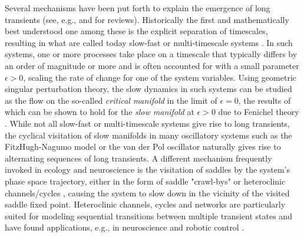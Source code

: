 \documentclass{article}
\theoremstyle{definition}
\begin{document}
\begin{refsection}
Several mechanisms have been put forth to explain the emergence of long transients (see, e.g., \cite{Hastings_2018} and \cite{Rossi_2025} for reviews). Historically the first and mathematically best understood one among these is the explicit separation of timescales, resulting in what are called today slow-fast or multi-timescale systems \cite{Tikhonov1952,Verhulst2005,Kuehn_2015,Bertram2017}. In such systems, one or more processes take place on a timescale that typically differs by an order of magnitude or more and is often accounted for with a small parameter $\epsilon>0$, scaling the rate of change for one of the system variables. Using geometric singular perturbation theory, the slow dynamics in such systems can be studied as the flow on the so-called \textit{critical manifold} in the limit of $\epsilon=0$, the results of which can be shown to hold for the \textit{slow manifold} at $\epsilon>0$ due to Fenichel theory \cite{Fenichel_1971,Fenichel_1979}. While not all slow-fast or multi-timescale systems give rise to long transients, the cyclical visitation of slow manifolds in many oscillatory systems such as the FitzHugh-Nagumo model or the van der Pol oscillator naturally gives rise to alternating sequences of long transients. A different mechanism frequently invoked in ecology and neuroscience is the visitation of saddles by the system's phase space trajectory, either in the form of saddle "crawl-bys" \cite{Hastings_2018} or heteroclinic channels/cycles \cite{May1975}, causing the system to slow down in the vicinity of the visited saddle fixed point. Heteroclinic channels, cycles and networks are particularly suited for modeling sequential transitions between multiple transient states and have found applications, e.g., in neuroscience \cite{Rabinovich2000,Afraimovich2004} and robotic control \cite{Horchler2015}.


\end{refsection}
\end{document}
